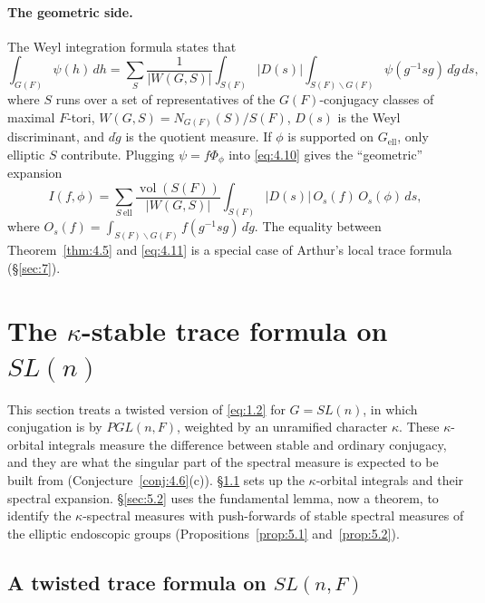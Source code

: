 \documentclass[12pt,letterpaper]{article}
\numberwithin{equation}{section}
\theoremstyle{plain}
\theoremstyle{remark}
\theoremstyle{plain}
\theoremstyle{definition}
\theoremstyle{remark}
\theoremstyle{remark}
\DeclareMathOperator{\vol}{vol}
\newcommand{\ellr}{\mathrm{ell}}
\begin{document}
\paragraph{The geometric side.} The Weyl integration formula states that
\begin{equation}\label{eq:4.10}
\int_{G(F)}\psi(h)\,dh=\sum_{S}\frac{1}{|W(G,S)|}\int_{S(F)}|D(s)|\int_{S(F)\backslash G(F)}\psi(g^{-1}sg)\,d\dot g\,ds,
\end{equation}
where $S$ runs over a set of representatives of the $G(F)$-conjugacy classes of maximal $F$-tori, $W(G,S)=N_{G(F)}(S)/S(F)$, $D(s)$ is the Weyl discriminant, and $d\dot g$ is the quotient measure. If $\phi$ is supported on $G_{\ellr}$, only elliptic $S$ contribute. Plugging $\psi=f\Phi_\phi$ into \eqref{eq:4.10} gives the ``geometric'' expansion
\begin{equation}\label{eq:4.11}
I(f,\phi)=\sum_{S\ \ellr}\frac{\vol(S(F))}{|W(G,S)|}\int_{S(F)}|D(s)|\,O_s(f)\,O_s(\phi)\,ds,
\end{equation}
where $O_s(f)=\int_{S(F)\backslash G(F)}f(g^{-1}sg)\,d\dot g$.
The equality between Theorem~\ref{thm:4.5} and \eqref{eq:4.11} is a special case of Arthur's local trace formula (\S\ref{sec:7}).

\section{The \texorpdfstring{$\kappa$}{kappa}-stable trace formula on \texorpdfstring{$SL(n)$}{SL(n)}}\label{sec:5}

This section treats a twisted version of \eqref{eq:1.2} for $G=SL(n)$, in which conjugation is by $PGL(n,F)$, weighted by an unramified character $\kappa$. These $\kappa$-orbital integrals measure the difference between stable and ordinary conjugacy, and they are what the singular part of the spectral measure is expected to be built from (Conjecture~\ref{conj:4.6}(c)). \S\ref{sec:5.1} sets up the $\kappa$-orbital integrals and their spectral expansion. \S\ref{sec:5.2} uses the fundamental lemma, now a theorem, to identify the $\kappa$-spectral measures with push-forwards of stable spectral measures of the elliptic endoscopic groups (Propositions~\ref{prop:5.1} and~\ref{prop:5.2}).


\subsection{A twisted trace formula on \texorpdfstring{$SL(n,F)$}{SL(n,F)}}\label{sec:5.1}
\end{document}
